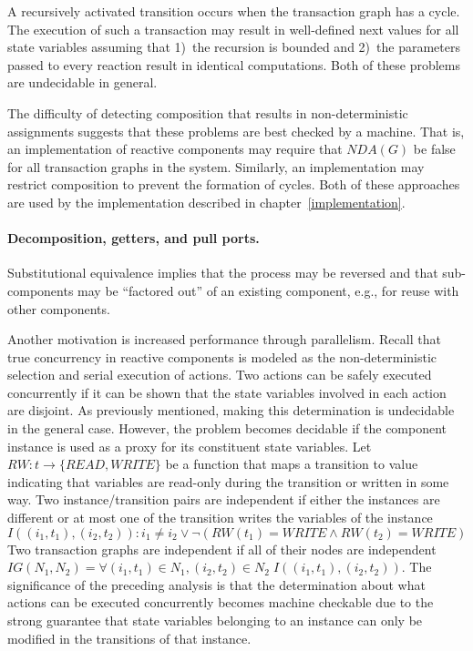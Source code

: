 A recursively activated transition occurs when the transaction graph has a cycle.
The execution of such a transaction may result in well-defined next values for all state variables assuming that 1)~the recursion is bounded and 2)~the parameters passed to every reaction result in identical computations.
Both of these problems are undecidable in general.

The difficulty of detecting composition that results in non-deterministic assignments suggests that these problems are best checked by a machine.
That is, an implementation of reactive components may require that $NDA(G)$ be false for all transaction graphs in the system.
Similarly, an implementation may restrict composition to prevent the formation of cycles.
Both of these approaches are used by the implementation described in chapter~\ref{implementation}.

\paragraph{Decomposition, getters, and pull ports.}
Substitutional equivalence implies that the process may be reversed and that sub-components may be ``factored out'' of an existing component, e.g., for reuse with other components.

Another motivation is increased performance through parallelism.
Recall that true concurrency in reactive components is modeled as the non-deterministic selection and serial execution of actions.
Two actions can be safely executed concurrently if it can be shown that the state variables involved in each action are disjoint.
As previously mentioned, making this determination is undecidable in the general case.
However, the problem becomes decidable if the component instance is used as a proxy for its constituent state variables.
Let $RW: t \to \{ READ, WRITE \}$ be a function that maps a transition to value indicating that variables are read-only during the transition or written in some way.
Two instance/transition pairs are independent if either the instances are different or at most one of the transition writes the variables of the instance
\begin{displaymath}
I((i_1, t_1), (i_2, t_2)): i_1 \ne i_2 \lor \lnot (RW(t_1) = WRITE \land RW(t_2) = WRITE)
\end{displaymath}
Two transaction graphs are independent if all of their nodes are independent $IG(N_1, N_2) = \forall (i_1, t_1) \in N_1, (i_2, t_2) \in N_2 \; I((i_1, t_1), (i_2, t_2))$.
The significance of the preceding analysis is that the determination about what actions can be executed concurrently becomes machine checkable due to the strong guarantee that state variables belonging to an instance can only be modified in the transitions of that instance.


